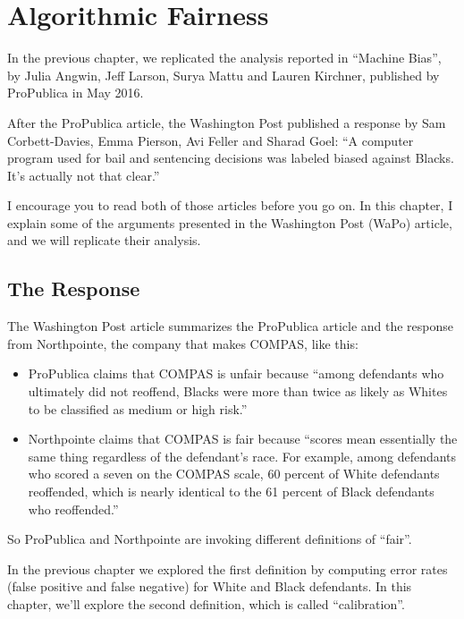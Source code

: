 \chapter{Algorithmic Fairness}\label{algorithmic-fairness}

In the previous chapter, we replicated the analysis reported in
``Machine Bias'', by Julia Angwin, Jeff Larson, Surya Mattu and Lauren
Kirchner, published by ProPublica in May 2016.

After the ProPublica article, the Washington Post published a response
by Sam Corbett-Davies, Emma Pierson, Avi Feller and Sharad Goel: ``A
computer program used for bail and sentencing decisions was labeled
biased against Blacks. It's actually not that clear.''

I encourage you to read both of those articles before you go on. In this
chapter, I explain some of the arguments presented in the Washington
Post (WaPo) article, and we will replicate their analysis.

\section{The Response}\label{the-response}

The Washington Post article summarizes the ProPublica article and the
response from Northpointe, the company that makes COMPAS, like this:

\begin{itemize}
\item
  ProPublica claims that COMPAS is unfair because ``among defendants who
  ultimately did not reoffend, Blacks were more than twice as likely as
  Whites to be classified as medium or high risk.''
\item
  Northpointe claims that COMPAS is fair because ``scores mean
  essentially the same thing regardless of the defendant's race. For
  example, among defendants who scored a seven on the COMPAS scale, 60
  percent of White defendants reoffended, which is nearly identical to
  the 61 percent of Black defendants who reoffended.''
\end{itemize}

So ProPublica and Northpointe are invoking different definitions of
``fair''.

In the previous chapter we explored the first definition by computing
error rates (false positive and false negative) for White and Black
defendants. In this chapter, we'll explore the second definition, which
is called ``calibration''.

